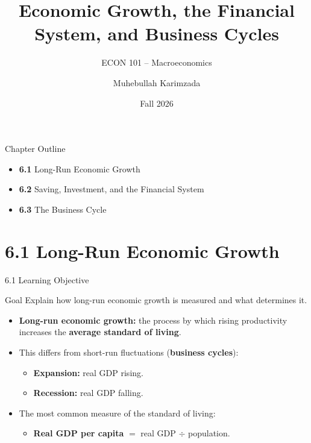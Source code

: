 \documentclass[aspectratio=169]{beamer}
\title{\textbf{Economic Growth, the Financial System, and Business Cycles}}
\subtitle{{\large ECON 101 -- Macroeconomics}}
\author{Muhebullah Karimzada}
\date{Fall 2026}
\begin{document}

\begin{frame}[plain]
  \titlepage
\end{frame}

\begin{frame}{Chapter Outline}
\transfade
\begin{itemize}
  \item \textbf{6.1} Long-Run Economic Growth
  \item \textbf{6.2} Saving, Investment, and the Financial System
  \item \textbf{6.3} The Business Cycle
\end{itemize}
\end{frame}

\section{6.1 Long-Run Economic Growth}

\begin{frame}{6.1 Learning Objective}
\transfade
\begin{block}{Goal}
Explain how long-run economic growth is measured and what determines it.
\end{block}
\begin{itemize}
  \item \textbf{Long-run economic growth:} the process by which rising \alert{productivity} increases the \textbf{average standard of living}.
  \item This differs from short-run fluctuations (\textbf{business cycles}):
  \begin{itemize}
    \item \textbf{Expansion:} real GDP rising.
    \item \textbf{Recession:} real GDP falling.
  \end{itemize}
  \item The most common measure of the standard of living:
  \begin{itemize}
    \item \textbf{Real GDP per capita} $=$ real GDP $\div$ population.
  \end{itemize}
\end{itemize}
\end{frame}
\end{document}
